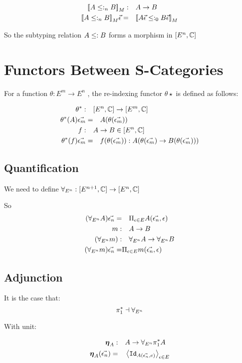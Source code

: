 \documentclass{report}
\begin{document}
\begin{align}
    {\bf [\![}A\leq:_n B{\bf ]\!]}_M:&\quad A\rightarrow B\\
    {\bf [\![}A\leq:_n B{\bf ]\!]}_M\vec{\epsilon}=&\quad {\bf [\![}A\vec{\epsilon}\leq:_0 B\vec{\epsilon}{\bf ]\!]}_M
\end{align}

So the subtyping relation $A \leq: B$ forms a morphism in $[E^n, \mathbb{C}]$

\section{Functors Between S-Categories}
For a function $\theta: E^m \rightarrow E^n$ , the re-indexing functor $\theta\star$ is defined as follows:

\begin{align}
    \theta^*:\quad& [E^n, \mathbb{C}] \rightarrow [E^m, \mathbb{C}]\\
    \theta^*(A)\vec{\epsilon_m}=&\quad A(\theta (\vec{\epsilon_m}))\\
    f:\quad& A \rightarrow B \in[E^n, \mathbb{C}]\\
    \theta^*(f)\vec{\epsilon_m} =&\quad f(\theta(\vec{\epsilon_m})): A(\theta(\vec{\epsilon_m})\rightarrow B(\theta(\vec{\epsilon_m})))
\end{align}

\subsection{Quantification}
We need to define $\forall_{E^n}: [E^{n+1}, \mathbb{C}]\rightarrow[E^n, \mathbb{C}]$

So
\begin{align}
    (\forall_{E^n} A)\vec{\epsilon_n} =&\quad \Pi_{\epsilon\in E} A(\vec{\epsilon_n}, \epsilon)\\
    m:&\quad A\rightarrow B\\
    (\forall_{E^n} m):&\quad \forall_{E^n} A\rightarrow \forall_{E^n} B\\
    (\forall_{E^n} m)\vec{\epsilon_n} =&\Pi_{\epsilon\in E} m(\vec{\epsilon_n}, \epsilon)\\
\end{align}

\subsection{Adjunction}
It is the case that:
$$\pi_1^* \dashv \forall_{E^n}$$

With unit:

\begin{align}
    \boldsymbol{\eta}_{A}:&\quad A \rightarrow \forall_{E^n}\pi_1^* A\\
    \boldsymbol{\eta}_{A}(\vec{\epsilon_n})=&\quad\left\langle\texttt{Id}_{A(\vec{\epsilon_n},e)}\right\rangle_{\epsilon\in E}
\end{align}
\end{document}
